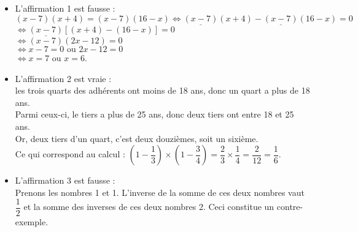    \begin{itemize}
      \item {\blue L'affirmation 1 est fausse} : \\
         $(x - 7)(x + 4) =(x -7)(16 - x) \iff \underline{(x - 7)}(x + 4) -\underline{(x -7)}(16 - x) =0$ \\
         \hspace*{4.6cm} $\iff \underline{(x - 7)}[(x + 4) -(16 - x)] =0$ \\
         \hspace*{4.6cm} $ \iff (x - 7)(2x-12) =0$ \\
         \hspace*{4.6cm} $ \iff x-7 =0 \text{ ou } 2x-12 =0$ \\
         \hspace*{4.6cm} $ \iff x =7 \text{ ou } x =6$.
      \item {\blue L'affirmation 2 est vraie} : \\
         les trois quarts des adhérents ont moins de 18 ans, donc un quart a plus de 18 ans. \\
         Parmi ceux-ci, le tiers a plus de 25 ans, donc deux tiers ont entre 18 et 25 ans. \\
         Or, deux tiers d'un quart, c'est deux douzièmes, soit un sixième. \\ [1mm]
         Ce qui correspond au calcul : $\left(1-\dfrac13\right)\times\left(1-\dfrac34\right) =\dfrac23\times\dfrac14 =\dfrac2{12} =\dfrac16$.
      \item {\blue L'affirmation 3 est fausse} : \\
         Prenons les nombres 1 et 1. L'inverse de la somme de ces deux nombres vaut $\dfrac12$ et la somme des inverses de ces deux nombres 2. Ceci constitue un contre-exemple.
   \end{itemize}
